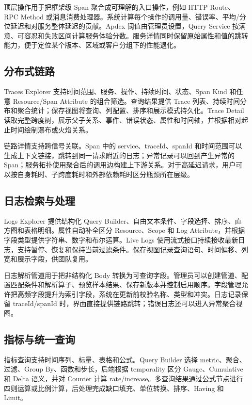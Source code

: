 \documentclass[conference,10pt]{IEEEtran}
\begin{document}
顶层操作用于把框架级 Span 聚合成可理解的入口操作，例如 HTTP Route、RPC Method 或消息消费处理器。系统计算每个操作的调用量、错误率、平均/分位延迟和对服务整体延迟的贡献。Apdex 阈值由管理员设置，Query Service 按满意、可容忍和失败区间计算服务体验分数。服务详情同时保留原始属性和值的跳转能力，便于定位某个版本、区域或客户分组下的性能退化。

\subsection{分布式链路}

Traces Explorer 支持时间范围、服务、操作、持续时间、状态、Span Kind 和任意 Resource/Span Attribute 的组合筛选。查询结果提供 Trace 列表、持续时间分布和聚合统计；保存视图将查询、列配置、排序和展示模式持久化。Trace Detail 读取完整跨度树，展示父子关系、事件、错误状态、属性和时间轴，并根据相对起止时间绘制瀑布或火焰关系。

链路详情支持跨信号关联。Span 中的 service、traceId、spanId 和时间范围可以生成上下文链接，跳转到同一请求附近的日志；异常记录可以回到产生异常的 Span；服务拓扑使用聚合后的调用边构建上下游关系。对于高延迟请求，用户可以按自身耗时、子跨度耗时和外部依赖耗时区分瓶颈所在层级。

\subsection{日志检索与处理}

Logs Explorer 提供结构化 Query Builder、自由文本条件、字段选择、排序、直方图和表格明细。属性自动补全区分 Resource、Scope 和 Log Attribute，并根据字段类型提供字符串、数字和布尔运算。Live Logs 使用流式接口持续接收最新日志，支持暂停、恢复和保持当前过滤条件。保存视图记录查询语句、时间偏移、列宽和展示字段，供团队复用。

日志解析管道用于把非结构化 Body 转换为可查询字段。管理员可以创建管道、配置匹配条件和解析算子、预览样本结果、保存新版本并控制启用顺序。字段管理允许把高频字段提升为索引字段，系统在更新前校验名称、类型和冲突。日志记录保留 traceId/spanId 时，界面直接提供链路跳转；错误日志还可以进入异常聚合视图。

\subsection{指标与统一查询}

指标查询支持时间序列、标量、表格和公式。Query Builder 选择 metric、聚合、过滤、Group By、函数和步长，后端根据 temporality 区分 Gauge、Cumulative 和 Delta 语义，并对 Counter 计算 rate/increase。多查询结果通过公式节点进行四则运算或比例计算，后处理完成缺口填充、单位转换、排序、Having 和 Limit。
\end{document}
